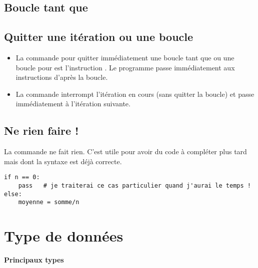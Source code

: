 \documentclass[11pt,class=report,crop=false]{standalone}
\begin{document}
\subsection{Boucle tant que}


\subsection{Quitter une itération ou une boucle}

\begin{itemize}
	\item La commande \Python{} pour quitter immédiatement une boucle \og{}tant que\fg{} ou une boucle \og{}pour\fg{} est l'instruction . Le programme passe immédiatement aux instructions d'après la boucle.
	
	\item La commande  interrompt l'itération en cours (sans quitter la boucle) et passe immédiatement à l'itération suivante.
\end{itemize}


\subsection{Ne rien faire !}

La commande  ne fait rien. C'est utile pour avoir du code à compléter plus tard mais dont la syntaxe est déjà correcte. 

\begin{lstlisting}
if n == 0:
    pass   # je traiterai ce cas particulier quand j'aurai le temps !
else: 
    moyenne = somme/n
\end{lstlisting}

\section{Type de données}

\textbf{Principaux types}
\end{document}
